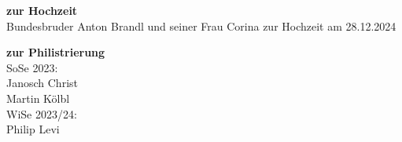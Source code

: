 {\begin{multicols}{2}



\textbf{zur Hochzeit}\\
Bundesbruder Anton Brandl und seiner Frau Corina
zur Hochzeit am 28.12.2024


\vspace{1.5mm}







\textbf{zur Philistrierung}\\
SoSe 2023:\\
Janosch Christ\\
Martin Kölbl\\
\newline
WiSe 2023/24:\\
Philip Levi


\vspace{1.5mm}








\end{multicols}


\vspace{1cm}

\begin{multicols}{2}



\end{multicols}}
